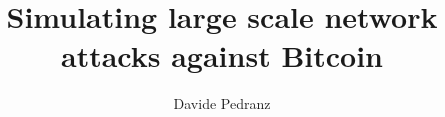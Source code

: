 \usepackage[utf8]{inputenc}
\usepackage[american]{babel}

\usepackage{csquotes}
\usepackage[style=trad-plain]{biblatex}


\RequirePackage{hyperref}
\hypersetup{hidelinks}
\hypersetup{pdfusetitle}
\renewcommand{\UrlFont}{\small\tt}

\usepackage[group-separator={,}]{siunitx}

\usepackage{graphicx}
\usepackage{subcaption}
\usepackage{float}

\usepackage{booktabs}

\usepackage[bottom]{footmisc}
\usepackage{chngcntr}

\usepackage{textcomp}

\usepackage{setspace}
\usepackage[algoruled]{algorithm2e}

\usepackage[noabbrev,capitalise]{cleveref}

\usepackage{setspace}

\RequirePackage[index=true]{acro}
\NewDocumentCommand{}
\NewDocumentCommand{}

\title{Simulating large scale network attacks against Bitcoin}
\author{Davide Pedranz}




\tableofcontents
\listoffigures







\printbibliography

